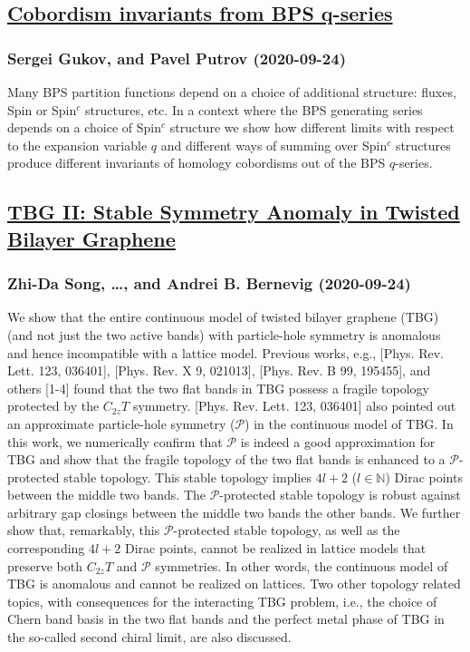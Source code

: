 \subsection*{\href{http://arxiv.org/abs/2009.11874v1}{Cobordism invariants from BPS q-series}}
\subsubsection*{Sergei Gukov, and Pavel Putrov (2020-09-24)}
Many BPS partition functions depend on a choice of additional structure:
fluxes, Spin or Spin$^c$ structures, etc. In a context where the BPS generating
series depends on a choice of Spin$^c$ structure we show how different limits
with respect to the expansion variable $q$ and different ways of summing over
Spin$^c$ structures produce different invariants of homology cobordisms out of
the BPS $q$-series.

\subsection*{\href{http://arxiv.org/abs/2009.11872v1}{TBG II: Stable Symmetry Anomaly in Twisted Bilayer Graphene}}
\subsubsection*{Zhi-Da Song, \dots, and Andrei B. Bernevig (2020-09-24)}
We show that the entire continuous model of twisted bilayer graphene (TBG)
(and not just the two active bands) with particle-hole symmetry is anomalous
and hence incompatible with a lattice model. Previous works, e.g., [Phys. Rev.
Lett. 123, 036401], [Phys. Rev. X 9, 021013], [Phys. Rev. B 99, 195455], and
others [1-4] found that the two flat bands in TBG possess a fragile topology
protected by the $C_{2z}T$ symmetry. [Phys. Rev. Lett. 123, 036401] also
pointed out an approximate particle-hole symmetry ($\mathcal{P}$) in the
continuous model of TBG. In this work, we numerically confirm that
$\mathcal{P}$ is indeed a good approximation for TBG and show that the fragile
topology of the two flat bands is enhanced to a $\mathcal{P}$-protected stable
topology. This stable topology implies $4l+2$ ($l\in\mathbb{N}$) Dirac points
between the middle two bands. The $\mathcal{P}$-protected stable topology is
robust against arbitrary gap closings between the middle two bands the other
bands. We further show that, remarkably, this $\mathcal{P}$-protected stable
topology, as well as the corresponding $4l + 2$ Dirac points, cannot be
realized in lattice models that preserve both $C_{2z}T$ and $\mathcal{P}$
symmetries. In other words, the continuous model of TBG is anomalous and cannot
be realized on lattices. Two other topology related topics, with consequences
for the interacting TBG problem, i.e., the choice of Chern band basis in the
two flat bands and the perfect metal phase of TBG in the so-called second
chiral limit, are also discussed.

